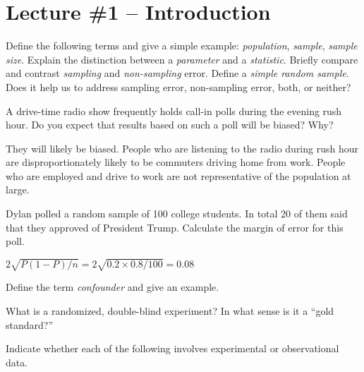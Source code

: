 \documentclass[addpoints,12pt]{exam}
\begin{document}
\section*{Lecture \#1 -- Introduction}
\begin{questions}

  \question Define the following terms and give a simple example: \emph{population}, \emph{sample}, \emph{sample size}.
  \question Explain the distinction between a \emph{parameter} and a \emph{statistic}.
  \question Briefly compare and contrast \emph{sampling} and \emph{non-sampling} error.
  \question Define a \emph{simple random sample}. Does it help us to address sampling error, non-sampling error, both, or neither? 

\question A drive-time radio show frequently holds call-in polls during the evening rush hour. Do you expect that results based on such a poll will be biased? Why? 
	\begin{solution}
    They will likely be biased.
		People who are listening to the radio during rush hour are disproportionately likely to be commuters driving home from work. People who are employed and drive to work are not representative of the population at large.  
	\end{solution}


\question Dylan polled a random sample of 100 college students. In total 20 of them said that they approved of President Trump. Calculate the margin of error for this poll.
\begin{solution}
  $2 \sqrt{P(1-P)/n} = 2 \sqrt{0.2 \times 0.8 / 100} = 0.08$
\end{solution}

\question Define the term \emph{confounder} and give an example.

\question What is a randomized, double-blind experiment? In what sense is it a ``gold standard?'' 

	
\question Indicate whether each of the following involves experimental or observational data.
\end{questions}
\end{document}
